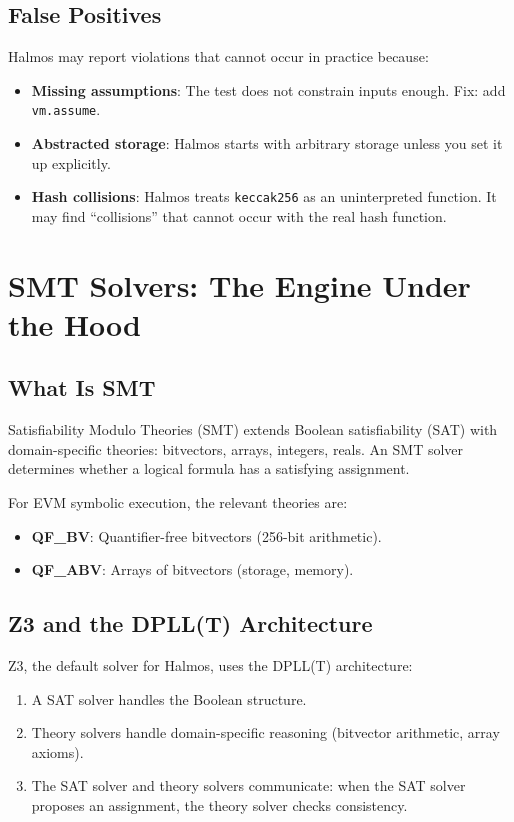 \documentclass[11pt,a4paper]{article}
\begin{document}
\subsection{False Positives}

Halmos may report violations that cannot occur in practice because:
\begin{itemize}[nosep]
  \item \textbf{Missing assumptions}: The test does not constrain inputs enough. Fix: add
    \texttt{vm.assume}.
  \item \textbf{Abstracted storage}: Halmos starts with arbitrary storage unless you set
    it up explicitly.
  \item \textbf{Hash collisions}: Halmos treats \texttt{keccak256} as an uninterpreted
    function. It may find ``collisions'' that cannot occur with the real hash function.
\end{itemize}

\section{SMT Solvers: The Engine Under the Hood}

\subsection{What Is SMT}

Satisfiability Modulo Theories (SMT) extends Boolean satisfiability (SAT) with
domain-specific theories: bitvectors, arrays, integers, reals. An SMT solver determines
whether a logical formula has a satisfying assignment.

For EVM symbolic execution, the relevant theories are:
\begin{itemize}[nosep]
  \item \textbf{QF\_BV}: Quantifier-free bitvectors (256-bit arithmetic).
  \item \textbf{QF\_ABV}: Arrays of bitvectors (storage, memory).
\end{itemize}

\subsection{Z3 and the DPLL(T) Architecture}

Z3, the default solver for Halmos, uses the DPLL(T) architecture:
\begin{enumerate}[nosep]
  \item A SAT solver handles the Boolean structure.
  \item Theory solvers handle domain-specific reasoning (bitvector arithmetic, array axioms).
  \item The SAT solver and theory solvers communicate: when the SAT solver proposes an
    assignment, the theory solver checks consistency.
\end{enumerate}
\end{document}
